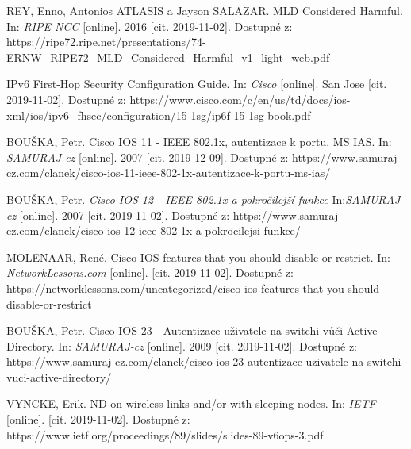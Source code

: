 \begin{literatura}{99}
REY, Enno, Antonios ATLASIS a Jayson SALAZAR. MLD Considered Harmful. In: \textit{RIPE NCC} [online]. 2016 [cit. 2019-11-02]. Dostupné z: https://ripe72.ripe.net/presentations/74-ERNW\_RIPE72\_MLD\_Considered\_Harmful\_v1\_light\_web.pdf






	
	
	








IPv6 First-Hop Security Configuration Guide. In: \textit{Cisco} [online]. San Jose [cit. 2019-11-02]. Dostupné z: https://www.cisco.com/c/en/us/td/docs/ios-xml/ios/ipv6\_fhsec/configuration/15-1sg/ip6f-15-1sg-book.pdf

BOUŠKA, Petr. Cisco IOS 11 - IEEE 802.1x, autentizace k portu, MS IAS. In: \textit{SAMURAJ-cz} [online]. 2007 [cit. 2019-12-09]. Dostupné z: https://www.samuraj-cz.com/clanek/cisco-ios-11-ieee-802-1x-autentizace-k-portu-ms-ias/


BOUŠKA, Petr. \textit{Cisco IOS 12 - IEEE 802.1x a pokročilejší funkce}  In:\textit{SAMURAJ-cz} [online]. 2007 [cit. 2019-11-02]. Dostupné z: https://www.samuraj-cz.com/clanek/cisco-ios-12-ieee-802-1x-a-pokrocilejsi-funkce/

MOLENAAR, René. Cisco IOS features that you should disable or restrict. In: \textit{NetworkLessons.com} [online]. [cit. 2019-11-02]. Dostupné z: https://networklessons.com/uncategorized/cisco-ios-features-that-you-should-disable-or-restrict

BOUŠKA, Petr. Cisco IOS 23 - Autentizace uživatele na switchi vůči Active Directory. In: \textit{SAMURAJ-cz} [online]. 2009 [cit. 2019-11-02]. Dostupné z: https://www.samuraj-cz.com/clanek/cisco-ios-23-autentizace-uzivatele-na-switchi-vuci-active-directory/

VYNCKE, Erik. ND on wireless links and/or with sleeping nodes. In: \textit{IETF} [online]. [cit. 2019-11-02]. Dostupné z: https://www.ietf.org/proceedings/89/slides/slides-89-v6ops-3.pdf




\end{literatura}

